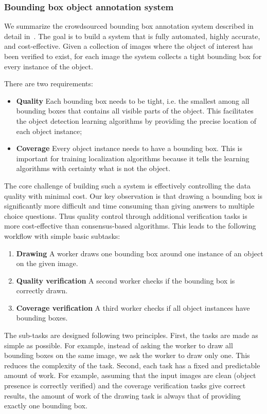 \begin{table}
\subsubsection{Bounding box object annotation system}
\label{sec:AnnotLocBbox}

We summarize the crowdsourced bounding box annotation system described in detail in~\citep{Su12}. The goal is to build a system that is fully automated, highly accurate, and cost-effective. Given a collection of images where the object of interest has been verified to exist, for each image the system collects a tight bounding box for every instance of the object. 

There are two requirements:

\begin{itemize}
\item {\bf Quality} Each bounding box needs to be tight, i.e. the smallest among all bounding boxes that contains all visible parts of the object. This facilitates the object detection learning algorithms by providing the precise location of each object instance;
\item {\bf Coverage} Every object instance needs to have a bounding box. This is important for training localization algorithms because it tells the learning algorithms with certainty what is not the object. 
\end{itemize}

The core challenge of building such a system is  effectively controlling the data quality with minimal cost. Our key observation is that drawing a bounding box is significantly more difficult and time consuming than giving answers to multiple choice questions. Thus quality control through additional verification tasks is more cost-effective than consensus-based algorithms. This leads to the following workflow with simple basic subtasks:

\begin{enumerate}
\item {\bf Drawing} A worker draws one bounding box around one instance of an object on the given image.
\item {\bf Quality verification} A second worker checks if the bounding box is correctly drawn.
\item {\bf Coverage verification} A third worker checks if all object instances have bounding boxes.
\end{enumerate}

 The sub-tasks are designed following two principles. First, the tasks are made as simple as possible. For example, instead of asking the worker to draw all bounding boxes on the same image, we ask the worker to draw only one. This reduces the complexity of the task. Second, each task has a fixed and predictable amount of work. For example, assuming that the input images are clean (object presence is correctly verified) and the coverage verification tasks give correct results, the amount of work of the drawing task is always that of providing exactly one bounding box.


\end{table}
